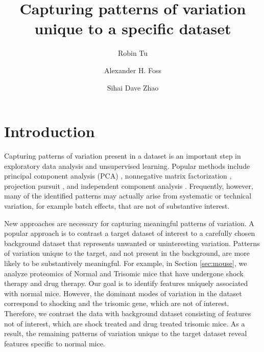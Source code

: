 \documentclass[12pt]{article}
\title{Capturing patterns of variation unique to a specific dataset}
\author[1]{Robin Tu}
\author[2]{ Alexander H. Foss }
\author[1]{Sihai Dave Zhao}
\affil[1]{Department of Statistics, University of Illinois at Urbana-Champaign, Champaign, IL}
\affil[2]{Statistical Sciences, Sandia National Laboratories, Albuquerque, NM}
\begin{document}
\maketitle

\section{Introduction}

Capturing patterns of variation present in a dataset is an important step in exploratory data analysis and unsupervised learning. Popular methods include principal component analysis (PCA) \cite{pca}, nonnegative matrix factorization \cite{Lee1999}, projection pursuit \cite{pp}, and independent component analysis \cite{ica}. Frequently, however, many of the identified patterns may actually arise from systematic or technical variation, for example batch effects, that are not of substantive interest.

New approaches are necessary for capturing meaningful patterns of variation. A popular approach is to contrast a target dataset of interest to a carefully chosen background dataset that represents unwanted or uninteresting variation. Patterns of variation unique to the target, and not present in the background, are more likely to be substantively meaningful.
For example, in Section \ref{sec:mouse}, we analyze proteomics of Normal and Trisomic mice that have undergone shock therapy and drug therapy. Our goal is to identify features uniquely associated with normal mice. However, the dominant modes of variation in the dataset correspond to shocking and the trisomic gene, which are not of interest. Therefore, we contrast the data with background dataset consisting of features not of interest, which are shock treated and drug treated trisomic mice. As a result, the remaining patterns of variation unique to the target dataset reveal features specific to normal mice.
\end{document}
